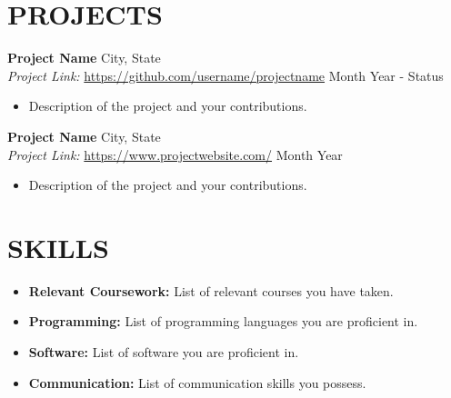 \documentclass[a4paper,9pt]{extarticle}
\begin{document}
\section*{PROJECTS}
\noindent
\textbf{Project Name} \hfill City, State\\ %
\textit{Project Link:} \url{https://github.com/username/projectname} \hfill Month Year - Status %
\begin{itemize}
    \item Description of the project and your contributions. %
\end{itemize}

\noindent
\textbf{Project Name} \hfill City, State\\ %
\textit{Project Link:} \url{https://www.projectwebsite.com/} \hfill Month Year %
\begin{itemize}
    \item Description of the project and your contributions. %
\end{itemize}

\section*{SKILLS}
\begin{itemize}
    \item \textbf{Relevant Coursework:} List of relevant courses you have taken. %
    \item \textbf{Programming:} List of programming languages you are proficient in. %
    \item \textbf{Software:} List of software you are proficient in. %
    \item \textbf{Communication:} List of communication skills you possess. %
\end{itemize}

\end{document}
